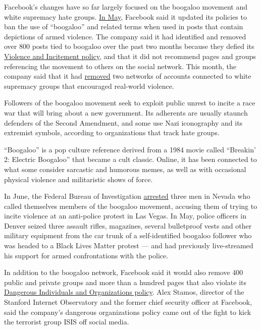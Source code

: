 Facebook's changes have so far largely focused on the boogaloo movement
and white supremacy hate groups.
\href{https://www.reuters.com/article/us-facebook-boogaloo/facebook-moves-to-limit-spread-of-boogaloo-groups-after-charges-idUSKBN23C011}{In
May}, Facebook said it updated its policies to ban the use of
``boogaloo'' and related terms when used in posts that contain
depictions of armed violence. The company said it had identified and
removed over 800 posts tied to boogaloo over the past two months because
they defied its
\href{https://www.facebookcorewwwi.onion/communitystandards/credible_violence}{Violence
and Incitement policy}, and that it did not recommend pages and groups
referencing the movement to others on the social network. This month,
the company said that it had
\href{https://www.nytimes3xbfgragh.onion/aponline/2020/06/17/business/ap-us-america-protests-facebook-hate-groups.html}{removed}
two networks of accounts connected to white supremacy groups that
encouraged real-world violence.

Followers of the boogaloo movement seek to exploit public unrest to
incite a race war that will bring about a new government. Its adherents
are usually staunch defenders of the Second Amendment, and some use Nazi
iconography and its extremist symbols, according to organizations that
track hate groups.

``Boogaloo'' is a pop culture reference derived from a 1984 movie called
``Breakin' 2: Electric Boogaloo'' that became a cult classic. Online, it
has been connected to what some consider sarcastic and humorous memes,
as well as with occasional physical violence and militaristic shows of
force.

In June, the Federal Bureau of Investigation
\href{https://www.nytimes3xbfgragh.onion/2020/06/11/us/antifa-protests-george-floyd.html}{arrested}
three men in Nevada who called themselves members of the boogaloo
movement, accusing them of trying to incite violence at an anti-police
protest in Las Vegas. In May, police officers in Denver seized three
assault rifles, magazines, several bulletproof vests and other military
equipment from the car trunk of a self-identified boogaloo follower who
was headed to a Black Lives Matter protest --- and had previously
live-streamed his support for armed confrontations with the police.

In addition to the boogaloo network, Facebook said it would also remove
400 public and private groups and more than a hundred pages that also
violate its
\href{https://www.facebookcorewwwi.onion/communitystandards/dangerous_individuals_organizations}{Dangerous
Individuals and Organizations policy}. Alex Stamos, director of the
Stanford Internet Observatory and the former chief security officer at
Facebook, said the company's dangerous organizations policy came out of
the fight to kick the terrorist group ISIS off social media.

